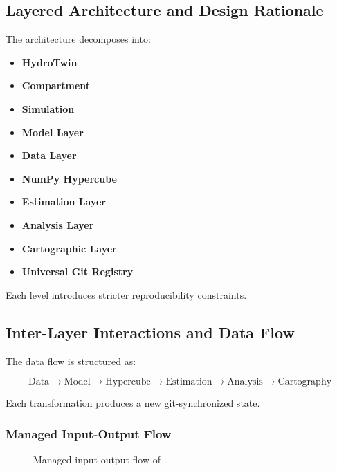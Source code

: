\subsection{Layered Architecture and Design Rationale}

The architecture decomposes into:

\begin{itemize}
\item \textbf{HydroTwin}
\item \textbf{Compartment}
\item \textbf{Simulation}
\item \textbf{Model Layer}
\item \textbf{Data Layer}
\item \textbf{NumPy Hypercube}
\item \textbf{Estimation Layer}
\item \textbf{Analysis Layer}
\item \textbf{Cartographic Layer}
\item \textbf{Universal Git Registry}
\end{itemize}

Each level introduces stricter reproducibility constraints.

\subsection{Inter-Layer Interactions and Data Flow}

The data flow is structured as:

\[
\text{Data} \rightarrow \text{Model} \rightarrow \text{Hypercube} \rightarrow \text{Estimation} \rightarrow \text{Analysis} \rightarrow \text{Cartography}
\]

Each transformation produces a new git-synchronized state.

\subsubsection{Managed Input-Output Flow}

\begin{figure}[H]
\centering
{}
\caption{Managed input-output flow of \hydrot.}
\label{fig:ht-managed-flow}
\end{figure}

